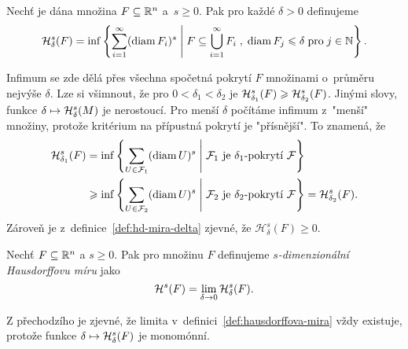 \begin{definition}\label{def:hd-mira-delta}
    Nechť je dána množina $F\subseteq\R^n$ a~$s\geqslant 0$. Pak pro každé $\delta>0$ definujeme
    \[\hausdorffdeltameasure{s}{\delta}(F)=\inf\set{\sum_{i=1}^{\infty}(\diam{F_i})^s\;\middle|\;F\subseteq\bigcup_{i=1}^\infty F_i\;,\;\diam{F_j}\leqslant\delta\;\text{pro}\;j\in\N}.\]
\end{definition}
Infimum se zde dělá přes všechna spočetná pokrytí $F$ množinami o~průměru nejvýše $\delta$. Lze si všimnout, že pro $0<\delta_1<\delta_2$ je $\hausdorffdeltameasure{s}{\delta_1}(F)\geqslant\hausdorffdeltameasure{s}{\delta_2}(F)$. Jinými slovy, funkce $\delta\mapsto\hausdorffdeltameasure{s}{\delta}(M)$ je nerostoucí. Pro menší $\delta$ počítáme infimum z~"menší" množiny, protože kritérium na přípustná pokrytí je "přísnější". To znamená, že
\begin{align*}
    \hausdorffdeltameasure{s}{\delta_1}(F)&=\inf\set{\sum_{U\in\mathcal{F}_1}(\diam{U})^s\;\middle|\;\text{$\mathcal{F}_1$ je $\delta_1$-pokrytí $\mathcal{F}$}}\\
    &\geqslant\inf\set{\sum_{U\in\mathcal{F}_2}(\diam{U})^s\;\middle|\;\text{$\mathcal{F}_2$ je $\delta_2$-pokrytí $\mathcal{F}$}}=\hausdorffdeltameasure{s}{\delta_2}(F).
\end{align*}
Zároveň je z~definice~\ref{def:hd-mira-delta} zjevné, že $\mathcal{H}_\delta^s(F)\geqslant 0$.
\begin{definition}\label{def:hausdorffova-mira}
    Nechť $F\subseteq\R^n$ a $s\geqslant 0$. Pak pro množinu $F$ definujeme \emph{$s$-dimenzionální Hausdorffovu míru} jako
    \[\hausdorffmeasure{s}(F)=\lim_{\delta\to 0}\hausdorffdeltameasure{s}{\delta}(F).\]
\end{definition}
Z přechodzího je zjevné, že limita v~definici~\ref{def:hausdorffova-mira} vždy existuje, protože funkce $\delta\mapsto\hausdorffdeltameasure{s}{\delta}(F)$ je monomónní.

